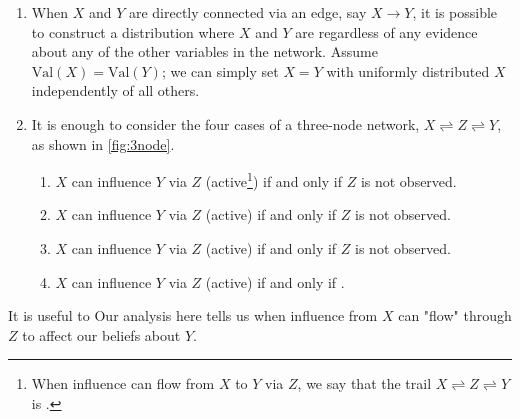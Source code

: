 \documentclass{article}
\begin{document}
\begin{enumerate}
    \item {} When $X$ and $Y$ are directly connected via an edge, say $X \rightarrow Y$, it is possible to construct a distribution where $X$ and $Y$ are  regardless of any evidence about any of the other variables in the network. Assume $\mathrm{Val}(X)=\mathrm{Val}(Y)$; we can simply set $X=Y$ with uniformly distributed $X$ independently  of all others.
    \item {} It is enough to consider the four cases of a three-node network,  $X \rightleftharpoons Z \rightleftharpoons Y$,  as shown in \cref{fig:3node}.
    \begin{enumerate}
        \item {} $X$ can influence $Y$ via $Z$ (active\footnote{When influence can flow from $X$ to $Y$ via $Z$, we say that the trail $X \rightleftharpoons Z \rightleftharpoons Y$ is .}) if and only if $Z$ is not observed.
        \item {} $X$ can influence $Y$ via $Z$ (active)  if and only if $Z$ is not observed.
        \item {} $X$ can influence $Y$ via $Z$ (active)  if and only if $Z$ is not observed.
        \item {} $X$ can influence $Y$ via $Z$ (active)  if and only if .

    \end{enumerate}
\end{enumerate}
\begin{rema}
It is useful to  Our analysis here tells us when influence from $X$ can "flow" through $Z$ to affect our beliefs about $Y$.
\end{rema}
\end{document}
